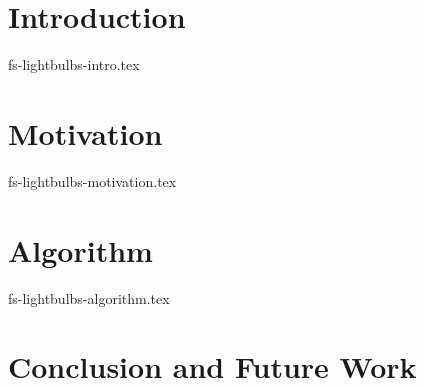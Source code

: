 \documentclass[sigconf]{acmart}
\theoremstyle{remark}
\begin{document}
\maketitle

\thispagestyle{empty}

\section {Introduction}
 {fs-lightbulbs-intro.tex}

\section {Motivation}
 {fs-lightbulbs-motivation.tex}

\section {Algorithm}
 {fs-lightbulbs-algorithm.tex}




\section{Conclusion and Future Work}




\end{document}
